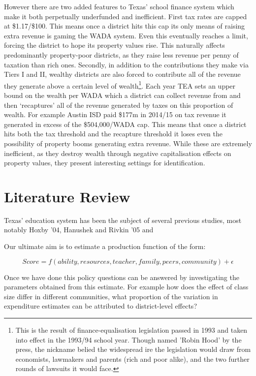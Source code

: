 \documentclass[11pt]{article}
\begin{document}
However there are two added features to Texas’ school finance system which make it both perpetually underfunded and inefficient. First tax rates are capped at \$1.17/\$100. This means once a district hits this cap its only means of raising extra revenue is gaming the WADA system. Even this eventually reaches a limit, forcing the district to hope its property values rise. This naturally affects predominantly property-poor districts, as they raise less revenue per penny of taxation than rich ones. Secondly, in addition to the contributions they make via Tiers I and II, wealthy districts are also forced to contribute all of the revenue they generate above a certain level of wealth\footnote{This is the result of finance-equalisation legislation passed in 1993 and taken into effect in the 1993/94 school year. Though named 'Robin Hood' by the press, the nickname belied the widespread ire the legislation would draw from economists, lawmakers and parents (rich and poor alike), and the two further rounds of lawsuits it would face.}. Each year TEA sets an upper bound on the wealth per WADA which a district can collect revenue from and then ‘recaptures’ all of the revenue generated by taxes on this proportion of wealth. For example Austin ISD paid \$177m in 2014/15 on tax revenue it generated in excess of the \$504,000/WADA cap. This means that once a district hits both the tax threshold and the recapture threshold it loses even the possibility of property booms generating extra revenue. While these are extremely inefficient, as they destroy wealth through negative capitalisation effects on property values, they present interesting settings for identification. 




\section{Literature Review}
\label{s:next}

Texas' education system has been the subject of several previous studies, most notably Hoxby '04, Hanushek and Rivkin '05 and 



Our ultimate aim is to estimate a production function of the form:

$$Score = f(ability,resources,teacher,family,peers,community) + \epsilon$$

Once we have done this policy questions can be answered by investigating the parameters obtained from this estimate. For example how does the effect of class size differ in different communities, what proportion of the variation in expenditure estimates can be attributed to district-level effects?
\end{document}

